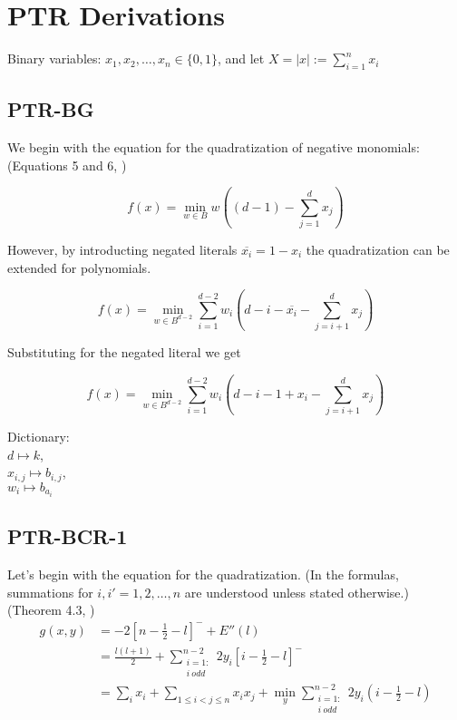 \documentclass[english,notitlepage,longbibliography,showpacs,preprintnumbers,amsmath,amssymb,aps,prx,nofootinbib,12pt,superscriptaddress]{revtex4-1}
\begin{document}
\section{\large PTR Derivations}

Binary variables: $x_1,x_2,\dots,x_n\in\{0,1\}$,
and let $X = |x|:=\sum_{i=1}^n x_i$


\subsection{PTR-BG}
\noindent We begin with the equation for the quadratization of negative monomials:
(Equations 5 and 6, \cite{Boros2014})

\begin{equation}
  f(x) = \min_{w\in B}w\left((d-1) - \sum_{j=1}^dx_j\right)
\end{equation}

\noindent However, by introducting negated literals $\overline{x_i} = 1-x_i$ the quadratization can be extended for polynomials.

\begin{equation}
  f(x) = \min_{w\in B^{d-2}}\sum_{i=1}^{d-2}w_i\left(d-i-\overline{x_i} - \sum_{j=i+1}^dx_j\right)
\end{equation}

\noindent Substituting for the negated literal we get

\begin{equation}
  f(x) = \min_{w\in B^{d-2}}\sum_{i=1}^{d-2}w_i\left(d-i-1+x_i - \sum_{j=i+1}^dx_j\right)
\end{equation}

\noindent Dictionary:\\
$d\mapsto k$,\\
$x_{i,j}\mapsto b_{i,j}$,\\
$w_i\mapsto b_{a_i}$\\

\subsection{PTR-BCR-1}

Let's begin with the equation for the quadratization. (In the formulas, summations for $i,i' = 1,2,\dots,n$ are understood unless stated otherwise.)\\
(Theorem 4.3, \cite{Anthony2014})
\begin{equation}
\begin{split}
  \left.
  g(x,y)
  \right.
  &= -2\left[n - \frac{1}{2} - l\right]^{-} + E''(l)\\
  &= \frac{l(l+1)}{2} + \sum_{\substack{i = 1:\\ i\:odd}}^{n-2}2y_i\left[i-\frac{1}{2}-l\right]^-\\
  &= \sum_i x_i + \sum_{1\leq i<j\leq n}x_ix_j + \min_y\sum_{\substack{i = 1:\\ i\:odd}}^{n-2}2y_i\left(i-\frac{1}{2}-l\right)
  \end{split}
\end{equation}
\end{document}
